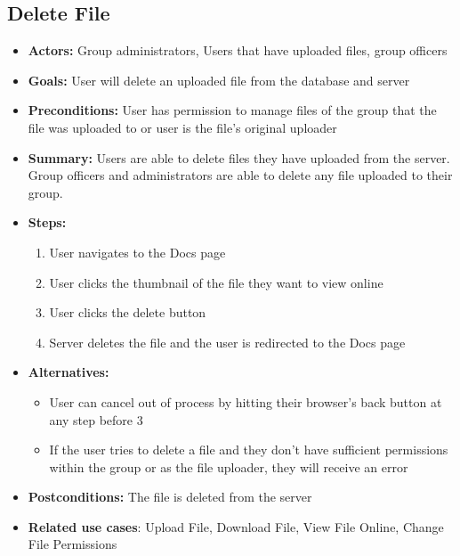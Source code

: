      \subsection{Delete File}
     \begin{itemize}
          \item{\textbf{Actors:} Group administrators, Users that have uploaded files, 
		   group officers}
          \item{\textbf{Goals:} User will delete an uploaded file from the database and server}
          \item{\textbf{Preconditions:} User has permission to manage files of the 
                 group that the file was uploaded to or user is the 
		   file's original uploader}
          \item{\textbf{Summary:} Users are able to delete files they have uploaded from the server. 
		   Group officers and administrators are able to delete any file uploaded to their group.}
	  \item{\textbf{Steps:}}
	  \begin{enumerate}
	       \item{User navigates to the Docs page}
	       \item{User clicks the thumbnail of the file they want to view online}
	       \item{User clicks the delete button}
	       \item{Server deletes the file and the user is redirected to the Docs page}
	  \end{enumerate}
	  \item{\textbf{Alternatives:}}
	  \begin{itemize}
	       \item{User can cancel out of process by hitting their 
		     browser's back button at any step before 3}
	       \item{If the user tries to delete a file and they don't have
		      sufficient permissions within the group or as the file uploader, 
		      they will receive an error}
	  \end{itemize}
	  \item{\textbf{Postconditions:} The file is deleted from the server}
	  \item{\textbf{Related use cases}: Upload File, Download File, 
		 View File Online, Change File Permissions}
     \end{itemize}

